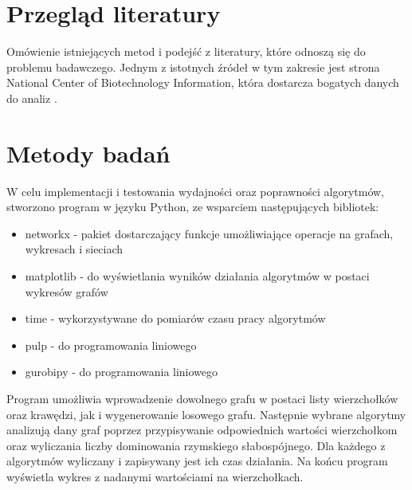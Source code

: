 \section{Przegląd literatury}
Omówienie istniejących metod i podejść z literatury, które odnoszą się do problemu badawczego. Jednym z istotnych źródeł w tym zakresie jest strona National Center of Biotechnology Information, która dostarcza bogatych danych do analiz \cite{openai2024}.

\section{Metody badań}
W celu implementacji i testowania wydajności oraz poprawności algorytmów, stworzono program w języku Python, ze wsparciem następujących bibliotek:
\begin{itemize}
    \item networkx - pakiet dostarczający funkcje umożliwiające operacje na grafach, wykresach i sieciach
    \item matplotlib - do wyświetlania wyników działania algorytmów w postaci wykresów grafów
    \item time - wykorzystywane do pomiarów czasu pracy algorytmów
    \item pulp - do programowania liniowego
    \item gurobipy - do programowania liniowego
\end{itemize}

Program umożliwia wprowadzenie dowolnego grafu w postaci listy wierzchołków oraz krawędzi, jak i wygenerowanie losowego grafu. Następnie wybrane algorytmy analizują dany graf poprzez przypisywanie odpowiednich wartości wierzchołkom oraz wyliczania liczby dominowania rzymskiego słabospójnego. Dla każdego z algorytmów wyliczany i zapisywany jest ich czas działania. Na końcu program wyświetla wykres z nadanymi wartościami na wierzchołkach. 


